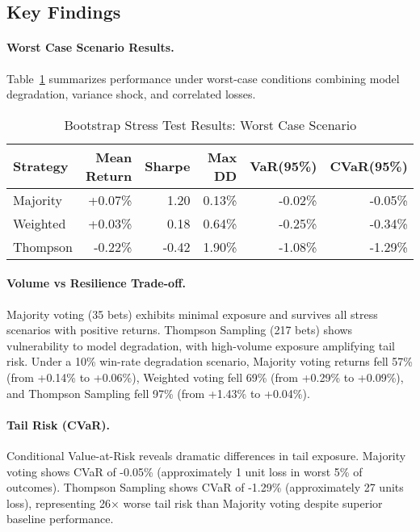 \subsection{Key Findings}

\paragraph{Worst Case Scenario Results.}
Table~\ref{tab:bootstrap-worst-case} summarizes performance under worst-case conditions combining model degradation, variance shock, and correlated losses.

\begin{table}[htbp]
\centering
\caption{Bootstrap Stress Test Results: Worst Case Scenario}
\label{tab:bootstrap-worst-case}
\begin{tabular}{@{} l r r r r r @{}}
\toprule
 \textbf{Strategy} & \textbf{Mean Return} & \textbf{Sharpe} & \textbf{Max DD} & \textbf{VaR(95\%)} & \textbf{CVaR(95\%)} \\
\midrule
Majority & +0.07\% & 1.20 & 0.13\% & -0.02\% & -0.05\% \\
Weighted & +0.03\% & 0.18 & 0.64\% & -0.25\% & -0.34\% \\
Thompson & -0.22\% & -0.42 & 1.90\% & -1.08\% & -1.29\% \\
\bottomrule
\end{tabular}
\end{table}

\paragraph{Volume vs Resilience Trade-off.}
Majority voting (35 bets) exhibits minimal exposure and survives all stress scenarios with positive returns. Thompson Sampling (217 bets) shows vulnerability to model degradation, with high-volume exposure amplifying tail risk. Under a 10\% win-rate degradation scenario, Majority voting returns fell 57\% (from +0.14\% to +0.06\%), Weighted voting fell 69\% (from +0.29\% to +0.09\%), and Thompson Sampling fell 97\% (from +1.43\% to +0.04\%).

\paragraph{Tail Risk (CVaR).}
Conditional Value-at-Risk reveals dramatic differences in tail exposure. Majority voting shows CVaR of -0.05\% (approximately 1 unit loss in worst 5\% of outcomes). Thompson Sampling shows CVaR of -1.29\% (approximately 27 units loss), representing 26× worse tail risk than Majority voting despite superior baseline performance.

